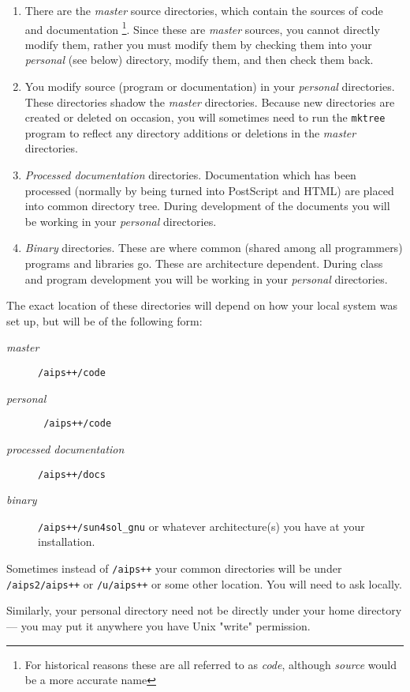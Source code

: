 \begin{enumerate}
\item 
There are the \emph{master} source directories, which contain the
sources of code and documentation \footnote{For historical reasons these
are all referred to as \emph{code}, although \emph{source} would be a
more accurate name}. Since these are \emph{master} sources, you cannot
directly modify them, rather you must modify them by checking them into
your \emph{personal} (see below) directory, modify them, and then check
them back.
\item
You modify source (program or documentation) in your \emph{personal}
directories. These directories shadow the \emph{master} directories.
Because new directories are created or deleted on occasion, you will
sometimes need to run the \texttt{mktree} program to reflect any directory
additions or deletions in the \emph{master} directories.
\item
\emph{Processed documentation} directories. Documentation which has been
processed (normally by being turned into PostScript and HTML) are placed into
common directory tree. During development of the documents you will be
working in your \textit{personal} directories.
\item
\emph{Binary} directories. These are where common (shared among all
programmers) programs and libraries go. These are architecture
dependent. During class and program development you will be working in
your \textit{personal} directories.
\end{enumerate}

The exact location of these directories will depend on how your local
system was set up, but will be of the following form:

\begin{description} 
\item[\emph{master}]
\texttt{/aips++/code}
\item[\emph{personal}]
\texttt{~/aips++/code}
\item[\emph{processed documentation}]
\texttt{/aips++/docs}
\item[\emph{binary}]
\texttt{/aips++/sun4sol\_gnu} or whatever architecture(s) you have at your
installation.
\end{description}

Sometimes instead of \texttt{/aips++} your common directories will be
under \texttt{/aips2/aips++} or \texttt{/u/aips++} or some other location.
You will need to ask locally.

Similarly, your personal directory need not be directly under your home
directory --- you may put it anywhere you have Unix "write" permission.

